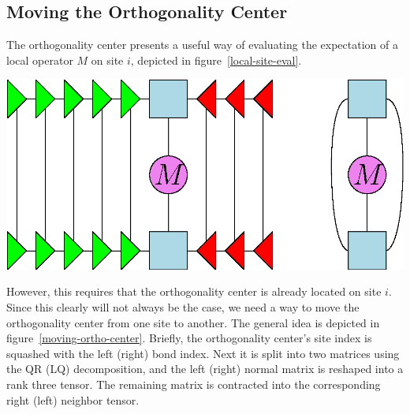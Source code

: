 \documentclass[12pt]{article}
\newenvironment{Figure}
  {\par\medskip\noindent\minipage{\linewidth}}
  {\endminipage\par\medskip}
\begin{document}
\begin{multicols}{2}
	\subsection*{Moving the Orthogonality Center}
	The orthogonality center presents a useful way of evaluating the
	expectation of a local operator $M$ on site $i$, depicted in
	figure~\ref{local-site-eval}.
	\begin{Figure}
		\center\includegraphics[width=.55\textwidth]{./Figures/local-site-eval.eps}
		\label{local-site-eval}
	\end{Figure}
	However, this requires that the orthogonality center is already
	located on site $i$. Since this clearly will not always be the case,
	we need a way to move the orthogonality center from one site to another.
	The general idea is depicted in figure~\ref{moving-ortho-center}.
	Briefly, the orthogonality center's site index is squashed with the
	left (right) bond index. Next it is split into two matrices
	using the QR (LQ) decomposition, and the left (right) normal matrix
	is reshaped into a rank three tensor. The remaining matrix is
	contracted into the corresponding right (left) neighbor tensor.


\end{multicols}
\end{document}
